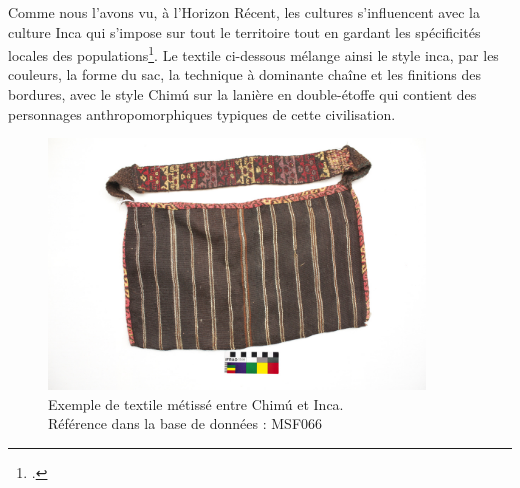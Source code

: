 Comme nous l'avons vu, à l'Horizon Récent, les cultures s'influencent avec la culture Inca qui s'impose sur tout le territoire tout en gardant les spécificités locales des populations\footcite[p.~53]{nilesArtistEmpireInca1994}.
Le textile ci-dessous mélange ainsi le style inca, par les couleurs, la forme du sac, la technique à dominante chaîne et les finitions des bordures, avec le style Chimú sur la lanière en double-étoffe qui contient des personnages anthropomorphiques typiques de cette civilisation.
\begin{figure}[!h]
	\begin{center}
		\includegraphics[width=10cm]{../images/MSF066.jpg}
		\caption{Exemple de textile métissé entre Chimú et Inca. \\ Référence dans la base de données : MSF066}
		\label{fig:MSF066}
	 \end{center}
\end{figure}

